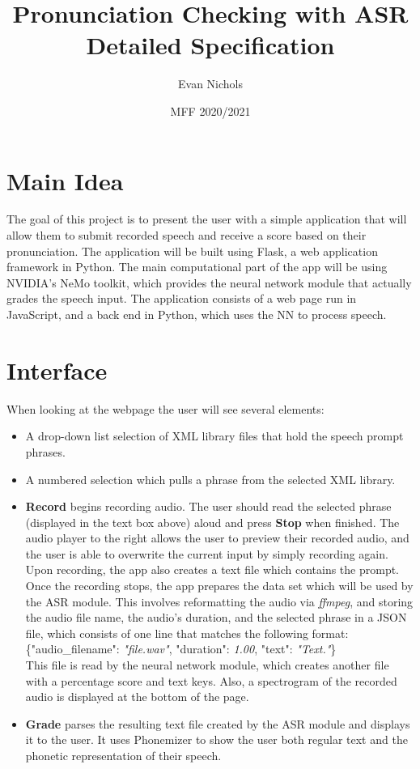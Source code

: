 \documentclass[12pt, letterpaper]{article}
\title{Pronunciation Checking with ASR\\ \small Detailed Specification}
\author{Evan Nichols}
\date{MFF 2020/2021}
\begin{document}
\maketitle

\section*{Main Idea}
The goal of this project is to present the user with a simple application that will allow them to submit recorded speech and receive a score based on their pronunciation. The application will be built using Flask, a web application framework in Python. The main computational part of the app will be using NVIDIA's NeMo toolkit, which provides the neural network module that actually grades the speech input. The application consists of a web page run in JavaScript, and a back end in Python, which uses the NN to process speech. 

\section*{Interface}
When looking at the webpage the user will see several elements:
\begin{itemize}
\item A drop-down list selection of XML library files that hold the speech prompt phrases.

\item A numbered selection which pulls a phrase from the selected XML library.

\item \textbf{Record} begins recording audio. The user should read the selected phrase (displayed in the text box above) aloud and press \textbf{Stop} when finished. The audio player to the right allows the user to preview their recorded audio, and the user is able to overwrite the current input by simply recording again. Upon recording, the app also creates a text file which contains the prompt. Once the recording stops, the app prepares the data set which will be used by the ASR module. This involves reformatting the audio via \textit{ffmpeg}, and storing the audio file name, the audio's duration, and the selected phrase in a JSON file, which consists of one line that matches the following format: \\
\hspace*{19mm} \{"audio\_filename": \textit{"file.wav"}, "duration": \textit{1.00}, "text": \textit{"Text."}\} \\
This file is read by the neural network module, which creates another file with a percentage score and text keys. Also, a spectrogram of the recorded audio is displayed at the bottom of the page.

\item \textbf{Grade} parses the resulting text file created by the ASR module and displays it to the user. It uses Phonemizer to show the user both regular text and the phonetic representation of their speech.
\end{itemize}
\newpage%
\end{document}

